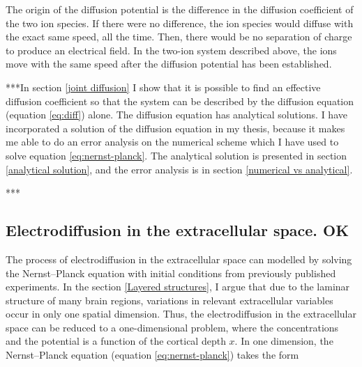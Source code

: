 \documentclass{article}
\begin{document}
The origin of the diffusion potential is the difference in the diffusion coefficient of the two ion species. If there were no difference, the ion species would diffuse with the exact same speed, all the time. Then, there would be no separation of charge to produce an electrical field. In the two-ion system described above, the ions move with the same speed after the diffusion potential has been established. 

***In section \ref{joint diffusion} I show that  it is possible to find an effective diffusion coefficient so that the system can be described by the diffusion equation (equation  \ref{eq:diff}) alone. 
The diffusion equation has analytical solutions. I have incorporated a solution of the diffusion equation in my thesis, because it makes me able to do an error analysis on the numerical scheme which I have used to solve equation \ref{eq:nernst-planck}. The analytical solution is presented in section \ref{analytical solution}, and the error analysis is in section \ref{numerical vs analytical}.

***

\subsection{Electrodiffusion in the extracellular space. OK}\label{el.diff in ES}


The process of electrodiffusion in the extracellular space can modelled by solving the Nernst--Planck equation with initial conditions from previously published experiments. In the section \ref{Layered structures}, I argue that due to the laminar structure of many brain regions, variations in relevant extracellular variables occur in only one spatial dimension. Thus, the electrodiffusion in the extracellular space can be reduced to a one-dimensional problem, where the concentrations and the potential is a function of the cortical depth $x$. In one dimension, the Nernst--Planck equation (equation \ref{eq:nernst-planck}) takes the form 
\end{document}
